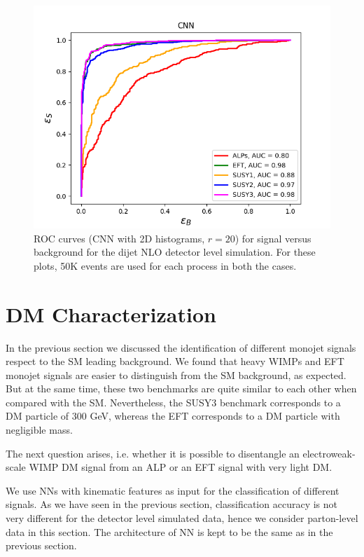 \documentclass[prd,aps,letterpaper,floatfix,superscriptaddress,preprintnumbers,twocolumn,10pt,nofootinbib]{revtex4-1}
\begin{document}
\begin{figure}%
\centering
\includegraphics[scale=0.50]{figures/2D_CNN_sig_vs_bg_delphes_pt-metphij1_ROC.png}
\caption{ROC curves (CNN with 2D histograms, $r = 20$) for signal versus background for the dijet NLO detector level simulation. For these plots, 50K events are used for each process in both the cases.}\label{2D_CNN_sig_vs_bg_NLO_ROC}
\end{figure}


 
\section{DM Characterization\label{DMvsDM}}

In the previous section we discussed the identification of different monojet signals respect to the SM leading background. We found that heavy WIMPs and EFT monojet signals are easier
to distinguish from the SM background, as expected. But at the same time, these two benchmarks are quite similar to each other when compared with the SM. Nevertheless, the SUSY3 benchmark corresponds to a DM particle of 300 GeV, whereas the EFT corresponds to a DM particle with negligible mass. 

The next question arises, i.e. whether it is possible to disentangle an electroweak-scale WIMP DM signal from an ALP or an EFT signal with very light DM. 

We use NNs with kinematic features as input for the 
classification of different signals. As we have seen in the previous section, classification accuracy is not very different for the detector level simulated data, hence we consider parton-level data in this section. The architecture of NN is kept to be the  same as in the previous section. 
\end{document}
